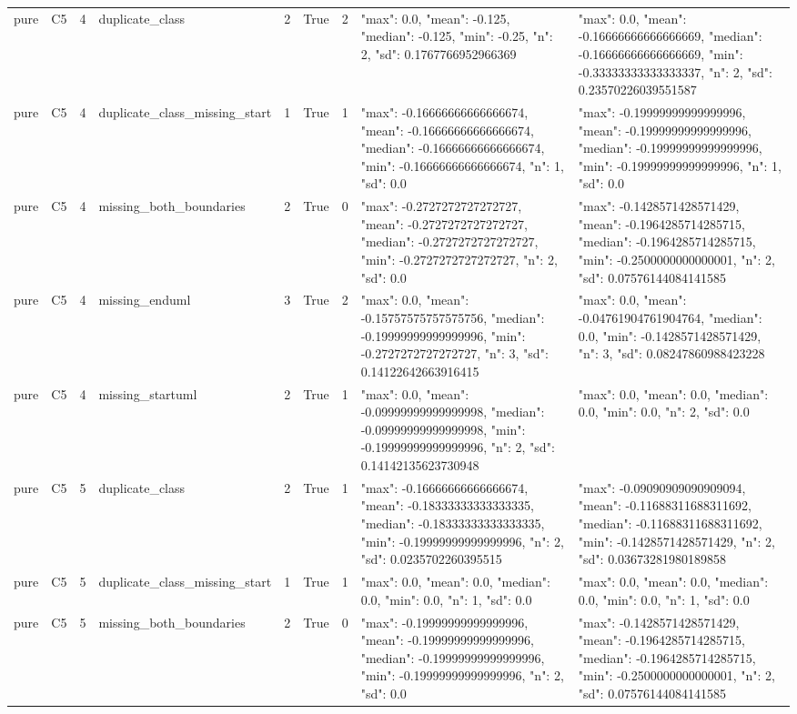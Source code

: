 \begin{tabular}{lllllllll}
pure & C5 & 4 & duplicate\_class & 2 & True & 2 & {"max": 0.0, "mean": -0.125, "median": -0.125, "min": -0.25, "n": 2, "sd": 0.1767766952966369} & {"max": 0.0, "mean": -0.16666666666666669, "median": -0.16666666666666669, "min": -0.33333333333333337, "n": 2, "sd": 0.23570226039551587} \\
pure & C5 & 4 & duplicate\_class\_missing\_start & 1 & True & 1 & {"max": -0.16666666666666674, "mean": -0.16666666666666674, "median": -0.16666666666666674, "min": -0.16666666666666674, "n": 1, "sd": 0.0} & {"max": -0.19999999999999996, "mean": -0.19999999999999996, "median": -0.19999999999999996, "min": -0.19999999999999996, "n": 1, "sd": 0.0} \\
pure & C5 & 4 & missing\_both\_boundaries & 2 & True & 0 & {"max": -0.2727272727272727, "mean": -0.2727272727272727, "median": -0.2727272727272727, "min": -0.2727272727272727, "n": 2, "sd": 0.0} & {"max": -0.1428571428571429, "mean": -0.1964285714285715, "median": -0.1964285714285715, "min": -0.2500000000000001, "n": 2, "sd": 0.07576144084141585} \\
pure & C5 & 4 & missing\_enduml & 3 & True & 2 & {"max": 0.0, "mean": -0.15757575757575756, "median": -0.19999999999999996, "min": -0.2727272727272727, "n": 3, "sd": 0.14122642663916415} & {"max": 0.0, "mean": -0.04761904761904764, "median": 0.0, "min": -0.1428571428571429, "n": 3, "sd": 0.08247860988423228} \\
pure & C5 & 4 & missing\_startuml & 2 & True & 1 & {"max": 0.0, "mean": -0.09999999999999998, "median": -0.09999999999999998, "min": -0.19999999999999996, "n": 2, "sd": 0.14142135623730948} & {"max": 0.0, "mean": 0.0, "median": 0.0, "min": 0.0, "n": 2, "sd": 0.0} \\
pure & C5 & 5 & duplicate\_class & 2 & True & 1 & {"max": -0.16666666666666674, "mean": -0.18333333333333335, "median": -0.18333333333333335, "min": -0.19999999999999996, "n": 2, "sd": 0.0235702260395515} & {"max": -0.09090909090909094, "mean": -0.11688311688311692, "median": -0.11688311688311692, "min": -0.1428571428571429, "n": 2, "sd": 0.03673281980189858} \\
pure & C5 & 5 & duplicate\_class\_missing\_start & 1 & True & 1 & {"max": 0.0, "mean": 0.0, "median": 0.0, "min": 0.0, "n": 1, "sd": 0.0} & {"max": 0.0, "mean": 0.0, "median": 0.0, "min": 0.0, "n": 1, "sd": 0.0} \\
pure & C5 & 5 & missing\_both\_boundaries & 2 & True & 0 & {"max": -0.19999999999999996, "mean": -0.19999999999999996, "median": -0.19999999999999996, "min": -0.19999999999999996, "n": 2, "sd": 0.0} & {"max": -0.1428571428571429, "mean": -0.1964285714285715, "median": -0.1964285714285715, "min": -0.2500000000000001, "n": 2, "sd": 0.07576144084141585} \\

\end{tabular}
